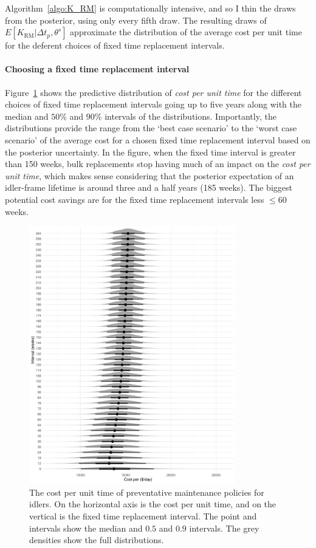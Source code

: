 Algorithm~\ref{algo:K_RM} is computationally intensive, and so I thin the draws from the posterior, using only every fifth draw. The resulting draws of $E[K_{\text{RM}}|\Delta t_p,\theta^s]$ approximate the distribution of the average cost per unit time for the deferent choices of fixed time replacement intervals.

\paragraph*{Choosing a fixed time replacement interval}

Figure~\ref{fig:preventative-repl-decision} shows the predictive distribution of \textit{cost per unit time} for the different choices of fixed time replacement intervals going up to five years along with the median and $50\%$ and $90\%$ intervals of the distributions. Importantly, the distributions provide the range from the `best case scenario' to the `worst case scenario' of the average cost for a chosen fixed time replacement interval based on the posterior uncertainty. In the figure, when the fixed time interval is greater than 150 weeks, bulk replacements stop having much of an impact on the \textit{cost per unit time}, which makes sense considering that the posterior expectation of an idler-frame lifetime is around three and a half years (185 weeks). The biggest potential cost savings are for the fixed time replacement intervals less $\le 60$ weeks.

\begin{figure}
  \centering
  \includegraphics[width=0.8\textwidth]{./figures/ch-3/cost-funciton.pdf}
  \caption{The cost per unit time of preventative maintenance policies for idlers. On the horizontal axis is the cost per unit time, and on the vertical is the fixed time replacement interval. The point and intervals show the median and $0.5$ and $0.9$ intervals. The grey densities show the full distributions.}
  \label{fig:preventative-repl-decision}
\end{figure}

